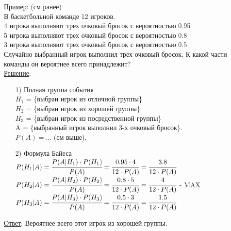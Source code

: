\underline{Пример}: (см ранее) \\
В баскетбольной команде 12 игроков. \\
4 игрока выполняют трех очковый бросок с вероятностью 0.95 \\
5 игрока выполняют трех очковый бросок с вероятностью 0.8 \\
3 игрока выполняют трех очковый бросок с вероятностью 0.5 \\
Случайно выбранный игрок выполнил трех очковый бросок. К какой части команды он вероятнее всего принадлежит? \\
\underline{Решение}: \\
\begin{enumerate}
\item[1)] Полная группа события \\
$H_1$ = \{выбран игрок из отличной группы\} \\
$H_2$ = \{выбран игрок из хорошей группы\} \\
$H_3$ = \{выбран игрок из посредственной группы\} \\

A = \{выбранный игрок выполнил 3-х очковый бросок\}. \\
$P(A) = ...$ (см выше). \\

\item[2)] Формула Байеса \\
$P(H_1|A) = \cfrac{P(A|H_1) \cdot P(H_1)}{P(A)} = \cfrac{0.95 \cdot 4}{12 \cdot P(A)} = \cfrac{3.8}{12 \cdot P(A)}$ \\
$P(H_2|A) = \cfrac{P(A|H_2) \cdot P(H_2)}{P(A)} = \cfrac{0.8 \cdot 5}{12 \cdot P(A)} = \cfrac{4}{12 \cdot P(A)}$ - MAX \\
$P(H_3|A) = \cfrac{P(A|H_3) \cdot P(H_3)}{P(A)} = \cfrac{0.5 \cdot 3}{12 \cdot P(A)} = \cfrac{1.5}{12 \cdot P(A)}$ \\
\end{enumerate}
\underline{Ответ}: Вероятнее всего этот игрок из хорошей группы.























